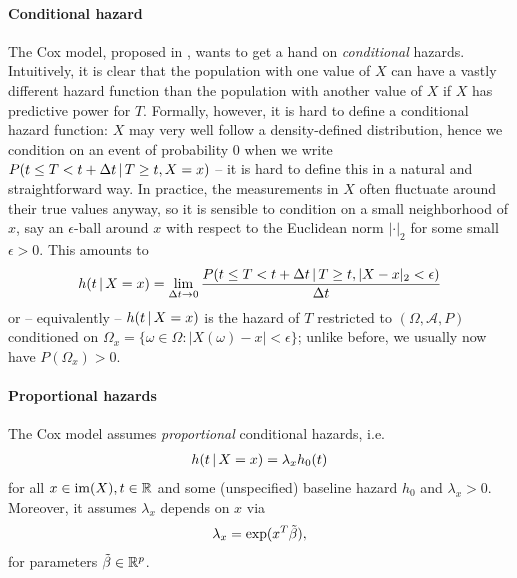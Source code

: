 \paragraph{Conditional hazard}
The Cox model, proposed in \cite{cox72}, wants to get a hand on \textit{conditional} hazards.
Intuitively, it is clear that the population with one value of $X$ can have a vastly different 
hazard function than the population with another value of $X$ if $X$ has predictive power for $T$.
Formally, however, it is hard to define a conditional hazard function: $X$ may very well follow a 
density-defined distribution, hence we condition on an event of probability $0$ when we write 
$P(t \leq T < t + \Delta t \,|\, T \geq t, X = x)$ -- it is hard to define this in a natural
and straightforward way. In practice, the measurements in $X$ often fluctuate around their true 
values anyway, so it is sensible to condition on a small neighborhood of $x$, say an $\epsilon$-ball 
around $x$ with respect to the Euclidean norm $|\cdot|_2$ for some small $\epsilon > 0$. This 
amounts to
\begin{align}
    h(t \,|\, X = x) = \lim_{\Delta t \to 0} \frac{P(t \leq T < t + \Delta t \,|\, T \geq t, 
    |X - x|_2 < \epsilon)}{\Delta t}
\end{align}
or -- equivalently -- $h(t \,|\, X = x)$ is the hazard of $T$ restricted to $(\Omega, \mathcal{A}, 
P)$ conditioned on $\Omega_x = \{ \omega \in \Omega: |X(\omega) - x| < \epsilon \}$; unlike before, 
we usually now have $P(\Omega_x) > 0$.

\paragraph{Proportional hazards} The Cox model assumes \textit{proportional} conditional hazards, 
i.e. 
\begin{align}
    h(t \,|\, X = x) = \lambda_x h_0(t)
\end{align}
for all $x \in \mathrm{im}(X), t \in \mathbb{R}$ and some (unspecified) baseline hazard $h_0$ and $\lambda_x > 0$. 
Moreover, it assumes $\lambda_x$ depends on $x$ via 
\begin{align}\label{eq:cox-proportional-factor}
    \lambda_x = \exp(x^T \tilde{\beta}),
\end{align}
for parameters $\tilde{\beta} \in \mathbb{R}^p$.

